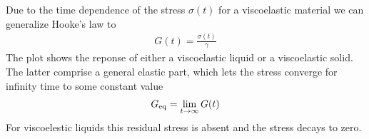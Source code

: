 \documentclass[letterpaper,10pt,english]{sphinxmanual}
\begin{document}
\sphinxAtStartPar
Due to the time dependence of the stress \(\sigma(t)\) for a viscoelastic material we can generalize Hooke’s law to
\begin{equation*}
\begin{split}G(t)=\frac{\sigma(t)}{\gamma}\end{split}
\end{equation*}
\sphinxAtStartPar
The plot shows the reponse of either a viscoelastic liquid or a viscoelastic solid. The latter comprise a general elastic part, which lets the stress converge for infinity time to some constant value
\begin{equation*}
\begin{split}G_{\rm eq}=\lim_{t\rightarrow \infty} G(t)\end{split}
\end{equation*}
\sphinxAtStartPar
For viscoelestic liquids this residual stress is absent and the stress decays to zero.

\noindent{}
\end{document}
